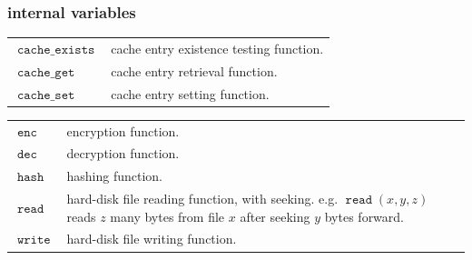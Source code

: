\documentclass[twocolumn]{article}
\DeclareMathOperator{\cexists}{\mathtt{cache\_exists}}
\DeclareMathOperator{\cget}{\mathtt{cache\_get}}
\DeclareMathOperator{\cset}{\mathtt{cache\_set}}
\DeclareMathOperator{\fread}{\mathtt{read}}
\DeclareMathOperator{\fwrite}{\mathtt{write}}
\DeclareMathOperator{\enc}{\mathtt{enc}}
\DeclareMathOperator{\dec}{\mathtt{dec}}
\DeclareMathOperator{\hash}{\mathtt{hash}}
\begin{document}
\subsubsection{internal variables}
\begin{tabularx}{\columnwidth}{lX}
    $\cexists$  & cache entry existence testing function.\\
    $\cget$     & cache entry retrieval function.\\
    $\cset$     & cache entry setting function.\\
\end{tabularx}
\begin{tabularx}{\columnwidth}{lX}
    $\enc$      & encryption function.\\
    $\dec$      & decryption function.\\
    $\hash$     & hashing function.\\
    $\fread$    & hard-disk file reading function, with seeking.  e.g.
                    $\fread(x, y, z)$ reads $z$ many bytes from file $x$
                    after seeking $y$ bytes forward.\\
    $\fwrite$   & hard-disk file writing function.\\
\end{tabularx}
\end{document}
